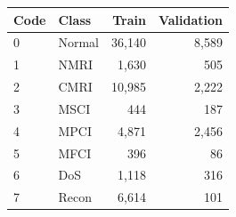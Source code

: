 \begin{tabular}{llrr}
\toprule
Code & Class & Train & Validation \\
\midrule
0 & Normal & 36,140 & 8,589 \\
1 & NMRI & 1,630 & 505 \\
2 & CMRI & 10,985 & 2,222 \\
3 & MSCI & 444 & 187 \\
4 & MPCI & 4,871 & 2,456 \\
5 & MFCI & 396 & 86 \\
6 & DoS & 1,118 & 316 \\
7 & Recon & 6,614 & 101 \\
\bottomrule
\end{tabular}
